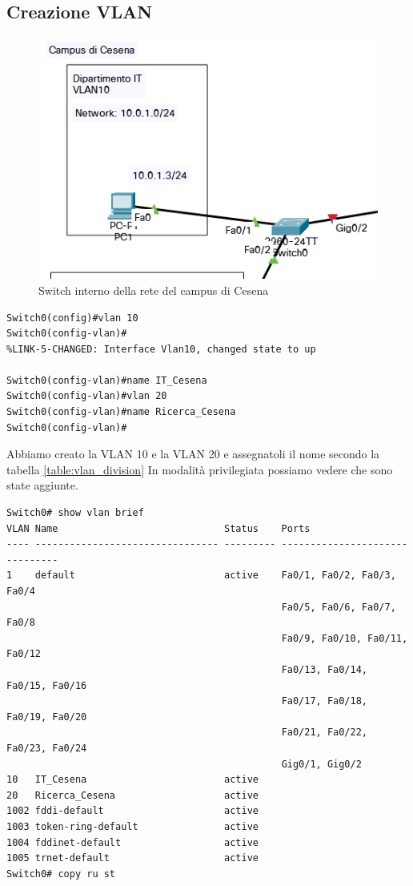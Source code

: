 \documentclass[a4paper,12pt]{report}
\begin{document}
\subsection{Creazione VLAN}
\begin{figure}
\includegraphics[]{configurazione_switch.png}
\caption{Switch interno della rete del campus di Cesena}
\label{fig:switch_cesena}
\end{figure}
\begin{verbatim}
Switch0(config)#vlan 10
Switch0(config-vlan)#
%LINK-5-CHANGED: Interface Vlan10, changed state to up

Switch0(config-vlan)#name IT_Cesena
Switch0(config-vlan)#vlan 20
Switch0(config-vlan)#name Ricerca_Cesena
Switch0(config-vlan)#
\end{verbatim}
Abbiamo creato la VLAN 10 e la VLAN 20 e assegnatoli il nome secondo la tabella \ref{table:vlan_division}
In modalità privilegiata possiamo vedere che sono state aggiunte.
\begin{verbatim}
Switch0# show vlan brief
VLAN Name                             Status    Ports
---- -------------------------------- --------- -------------------------------
1    default                          active    Fa0/1, Fa0/2, Fa0/3, Fa0/4
                                                Fa0/5, Fa0/6, Fa0/7, Fa0/8
                                                Fa0/9, Fa0/10, Fa0/11, Fa0/12
                                                Fa0/13, Fa0/14, Fa0/15, Fa0/16
                                                Fa0/17, Fa0/18, Fa0/19, Fa0/20
                                                Fa0/21, Fa0/22, Fa0/23, Fa0/24
                                                Gig0/1, Gig0/2
10   IT_Cesena                        active    
20   Ricerca_Cesena                   active    
1002 fddi-default                     active    
1003 token-ring-default               active    
1004 fddinet-default                  active    
1005 trnet-default                    active    
Switch0# copy ru st
\end{verbatim}
\end{document}
